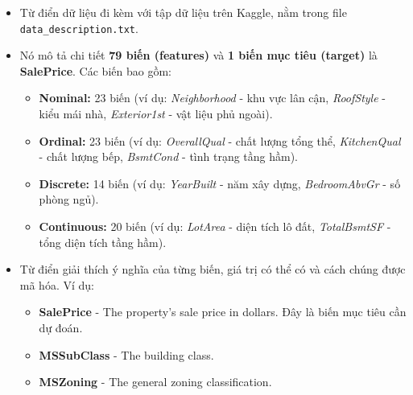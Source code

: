 


\begin{itemize}
    \item Từ điển dữ liệu đi kèm với tập dữ liệu trên Kaggle, nằm trong file \texttt{data\_description.txt}.
    \item Nó mô tả chi tiết \textbf{79 biến (features)} và \textbf{1 biến mục tiêu (target)} là \textbf{SalePrice}. Các biến bao gồm:
    \begin{itemize}
        \item \textbf{Nominal:} 23 biến (ví dụ: \textit{Neighborhood} - khu vực lân cận, \textit{RoofStyle} - kiểu mái nhà, \textit{Exterior1st} - vật liệu phủ ngoài).
        \item \textbf{Ordinal:} 23 biến (ví dụ: \textit{OverallQual} - chất lượng tổng thể, \textit{KitchenQual} - chất lượng bếp, \textit{BsmtCond} - tình trạng tầng hầm).
        \item \textbf{Discrete:} 14 biến (ví dụ: \textit{YearBuilt} - năm xây dựng, \textit{BedroomAbvGr} - số phòng ngủ).
        \item \textbf{Continuous:} 20 biến (ví dụ: \textit{LotArea} - diện tích lô đất, \textit{TotalBsmtSF} - tổng diện tích tầng hầm).
    \end{itemize}
    \item Từ điển giải thích ý nghĩa của từng biến, giá trị có thể có và cách chúng được mã hóa. Ví dụ:
    \begin{itemize}
        \item \textbf{SalePrice} - The property's sale price in dollars. Đây là biến mục tiêu cần dự đoán.
        \item \textbf{MSSubClass} - The building class.
        \item \textbf{MSZoning} - The general zoning classification.
    \end{itemize}
\end{itemize}


